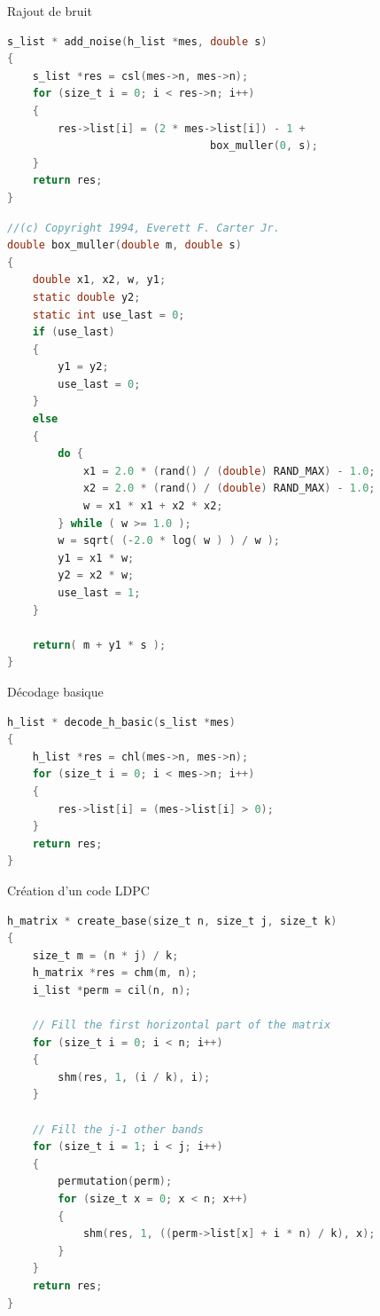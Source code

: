 \documentclass[11pt]{beamer}
\begin{document}
\begin{frame}{Rajout de bruit}
	\begin{lstlisting}[language=C]
s_list * add_noise(h_list *mes, double s)
{
	s_list *res = csl(mes->n, mes->n);
	for (size_t i = 0; i < res->n; i++)
	{
		res->list[i] = (2 * mes->list[i]) - 1 + 
								box_muller(0, s);
	}
	return res;
}
	\end{lstlisting}
\end{frame}

\begin{frame}
	\begin{lstlisting}[language=C]
//(c) Copyright 1994, Everett F. Carter Jr.
double box_muller(double m, double s)
{
	double x1, x2, w, y1;
	static double y2;
	static int use_last = 0;
	if (use_last)
	{
		y1 = y2;
		use_last = 0;
	}
	else
	{
		do {
			x1 = 2.0 * (rand() / (double) RAND_MAX) - 1.0;
			x2 = 2.0 * (rand() / (double) RAND_MAX) - 1.0;
			w = x1 * x1 + x2 * x2;
		} while ( w >= 1.0 );
		w = sqrt( (-2.0 * log( w ) ) / w );
		y1 = x1 * w;
		y2 = x2 * w;
		use_last = 1;
	}
	
	return( m + y1 * s );
}
	\end{lstlisting}
\end{frame}

\begin{frame}{D\'ecodage basique}
	\begin{lstlisting}[language=C]
h_list * decode_h_basic(s_list *mes)
{
	h_list *res = chl(mes->n, mes->n);
	for (size_t i = 0; i < mes->n; i++)
	{
		res->list[i] = (mes->list[i] > 0);
	}
	return res;
}
	\end{lstlisting}
\end{frame}


\begin{frame}{Cr\'eation d'un code LDPC}
	\begin{lstlisting}[language=C]
h_matrix * create_base(size_t n, size_t j, size_t k)
{
    size_t m = (n * j) / k;
    h_matrix *res = chm(m, n);
    i_list *perm = cil(n, n);

    // Fill the first horizontal part of the matrix
    for (size_t i = 0; i < n; i++)
    {
        shm(res, 1, (i / k), i);
    }

    // Fill the j-1 other bands
    for (size_t i = 1; i < j; i++)
    {
        permutation(perm);
        for (size_t x = 0; x < n; x++)
        {
            shm(res, 1, ((perm->list[x] + i * n) / k), x);
        }
    }
    return res;
}
	\end{lstlisting}
\end{frame}
\end{document}
